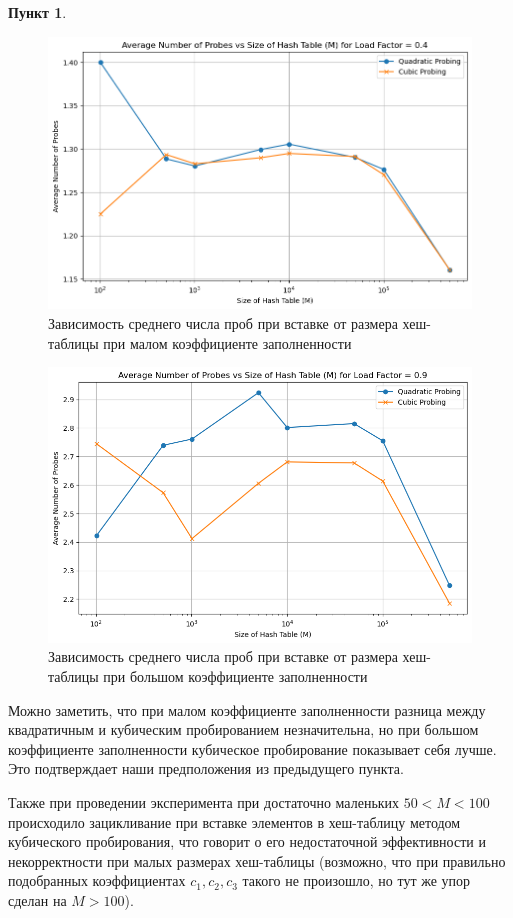\documentclass[11pt,a4paper]{scrarticle}
\theoremstyle{definition}
\newtheorem{subtask}{Пункт}
\begin{document}
\begin{subtask}
    \begin{figure}[H]
        \centering
        \includegraphics[width=\textwidth]{static/04.png}
        \caption{Зависимость среднего числа проб при вставке от размера хеш-таблицы при малом коэффициенте заполненности}
    \end{figure}

    \begin{figure}[H]
        \centering
        \includegraphics[width=\textwidth]{static/092.png}
        \caption{Зависимость среднего числа проб при вставке от размера хеш-таблицы при большом коэффициенте заполненности}
    \end{figure}

    Можно заметить, что при малом коэффициенте заполненности разница между квадратичным и кубическим пробированием незначительна, но при большом коэффициенте заполненности кубическое пробирование показывает себя лучше. Это подтверждает наши предположения из предыдущего пункта.

    Также при проведении эксперимента при достаточно маленьких $50 < M < 100$ происходило зацикливание при вставке элементов в хеш-таблицу методом кубического пробирования, что говорит о его недостаточной эффективности и некорректности при малых размерах хеш-таблицы (возможно, что при правильно подобранных коэффициентах $c_1, c_2, c_3$ такого не произошло, но тут же упор сделан на $M > 100$).
\end{subtask}
\end{document}
